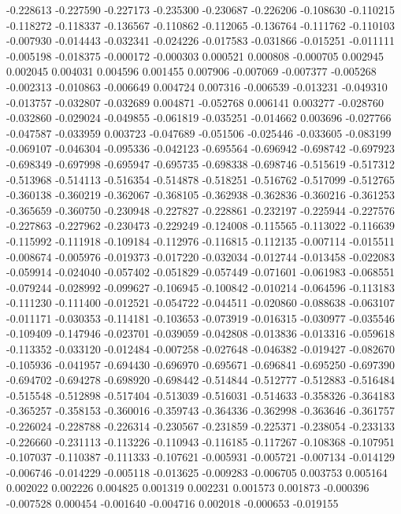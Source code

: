 -0.228613
-0.227590
-0.227173
-0.235300
-0.230687
-0.226206
-0.108630
-0.110215
-0.118272
-0.118337
-0.136567
-0.110862
-0.112065
-0.136764
-0.111762
-0.110103
-0.007930
-0.014443
-0.032341
-0.024226
-0.017583
-0.031866
-0.015251
-0.011111
-0.005198
-0.018375
-0.000172
-0.000303
0.000521
0.000808
-0.000705
0.002945
0.002045
0.004031
0.004596
0.001455
0.007906
-0.007069
-0.007377
-0.005268
-0.002313
-0.010863
-0.006649
0.004724
0.007316
-0.006539
-0.013231
-0.049310
-0.013757
-0.032807
-0.032689
0.004871
-0.052768
0.006141
0.003277
-0.028760
-0.032860
-0.029024
-0.049855
-0.061819
-0.035251
-0.014662
0.003696
-0.027766
-0.047587
-0.033959
0.003723
-0.047689
-0.051506
-0.025446
-0.033605
-0.083199
-0.069107
-0.046304
-0.095336
-0.042123
-0.695564
-0.696942
-0.698742
-0.697923
-0.698349
-0.697998
-0.695947
-0.695735
-0.698338
-0.698746
-0.515619
-0.517312
-0.513968
-0.514113
-0.516354
-0.514878
-0.518251
-0.516762
-0.517099
-0.512765
-0.360138
-0.360219
-0.362067
-0.368105
-0.362938
-0.362836
-0.360216
-0.361253
-0.365659
-0.360750
-0.230948
-0.227827
-0.228861
-0.232197
-0.225944
-0.227576
-0.227863
-0.227962
-0.230473
-0.229249
-0.124008
-0.115565
-0.113022
-0.116639
-0.115992
-0.111918
-0.109184
-0.112976
-0.116815
-0.112135
-0.007114
-0.015511
-0.008674
-0.005976
-0.019373
-0.017220
-0.032034
-0.012744
-0.013458
-0.022083
-0.059914
-0.024040
-0.057402
-0.051829
-0.057449
-0.071601
-0.061983
-0.068551
-0.079244
-0.028992
-0.099627
-0.106945
-0.100842
-0.010214
-0.064596
-0.113183
-0.111230
-0.111400
-0.012521
-0.054722
-0.044511
-0.020860
-0.088638
-0.063107
-0.011171
-0.030353
-0.114181
-0.103653
-0.073919
-0.016315
-0.030977
-0.035546
-0.109409
-0.147946
-0.023701
-0.039059
-0.042808
-0.013836
-0.013316
-0.059618
-0.113352
-0.033120
-0.012484
-0.007258
-0.027648
-0.046382
-0.019427
-0.082670
-0.105936
-0.041957
-0.694430
-0.696970
-0.695671
-0.696841
-0.695250
-0.697390
-0.694702
-0.694278
-0.698920
-0.698442
-0.514844
-0.512777
-0.512883
-0.516484
-0.515548
-0.512898
-0.517404
-0.513039
-0.516031
-0.514633
-0.358326
-0.364183
-0.365257
-0.358153
-0.360016
-0.359743
-0.364336
-0.362998
-0.363646
-0.361757
-0.226024
-0.228788
-0.226314
-0.230567
-0.231859
-0.225371
-0.238054
-0.233133
-0.226660
-0.231113
-0.113226
-0.110943
-0.116185
-0.117267
-0.108368
-0.107951
-0.107037
-0.110387
-0.111333
-0.107621
-0.005931
-0.005721
-0.007134
-0.014129
-0.006746
-0.014229
-0.005118
-0.013625
-0.009283
-0.006705
0.003753
0.005164
0.002022
0.002226
0.004825
0.001319
0.002231
0.001573
0.001873
-0.000396
-0.007528
0.000454
-0.001640
-0.004716
0.002018
-0.000653
-0.019155
